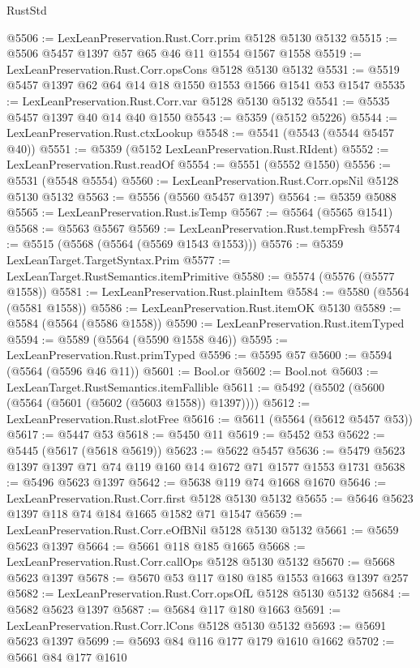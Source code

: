 \begin{lexlean}{RustStd}
\begin{coremodule}
{\begin{coremodule}
{{{{{{{{{{{{{{{{{{{{{{{{{{{{{{{{@5506 := LexLeanPreservation.Rust.Corr.prim @5128 @5130 @5132
@5515 := @5506 @5457 @1397 @57 @65 @46 @11 @1554 @1567 @1558
@5519 := LexLeanPreservation.Rust.Corr.opsCons @5128 @5130 @5132
@5531 := @5519 @5457 @1397 @62 @64 @14 @18 @1550 @1553 @1566 @1541 @53 @1547
@5535 := LexLeanPreservation.Rust.Corr.var @5128 @5130 @5132
@5541 := @5535 @5457 @1397 @40 @14 @40 @1550
@5543 := @5359 (@5152 @5226)
@5544 := LexLeanPreservation.Rust.ctxLookup
@5548 := @5541 (@5543 (@5544 @5457 @40))
@5551 := @5359 (@5152 LexLeanPreservation.Rust.RIdent)
@5552 := LexLeanPreservation.Rust.readOf
@5554 := @5551 (@5552 @1550)
@5556 := @5531 (@5548 @5554)
@5560 := LexLeanPreservation.Rust.Corr.opsNil @5128 @5130 @5132
@5563 := @5556 (@5560 @5457 @1397)
@5564 := @5359 @5088
@5565 := LexLeanPreservation.Rust.isTemp
@5567 := @5564 (@5565 @1541)
@5568 := @5563 @5567
@5569 := LexLeanPreservation.Rust.tempFresh
@5574 := @5515 (@5568 (@5564 (@5569 @1543 @1553)))
@5576 := @5359 LexLeanTarget.TargetSyntax.Prim
@5577 := LexLeanTarget.RustSemantics.itemPrimitive
@5580 := @5574 (@5576 (@5577 @1558))
@5581 := LexLeanPreservation.Rust.plainItem
@5584 := @5580 (@5564 (@5581 @1558))
@5586 := LexLeanPreservation.Rust.itemOK @5130
@5589 := @5584 (@5564 (@5586 @1558))
@5590 := LexLeanPreservation.Rust.itemTyped
@5594 := @5589 (@5564 (@5590 @1558 @46))
@5595 := LexLeanPreservation.Rust.primTyped
@5596 := @5595 @57
@5600 := @5594 (@5564 (@5596 @46 @11))
@5601 := Bool.or
@5602 := Bool.not
@5603 := LexLeanTarget.RustSemantics.itemFallible
@5611 := @5492 (@5502 (@5600 (@5564 (@5601 (@5602 (@5603 @1558)) @1397))))
@5612 := LexLeanPreservation.Rust.slotFree
@5616 := @5611 (@5564 (@5612 @5457 @53))
@5617 := @5447 @53
@5618 := @5450 @11
@5619 := @5452 @53
@5622 := @5445 (@5617 (@5618 @5619))
@5623 := @5622 @5457
@5636 := @5479 @5623 @1397 @1397 @71 @74 @119 @160 @14 @1672 @71 @1577 @1553 @1731
@5638 := @5496 @5623 @1397
@5642 := @5638 @119 @74 @1668 @1670
@5646 := LexLeanPreservation.Rust.Corr.first @5128 @5130 @5132
@5655 := @5646 @5623 @1397 @118 @74 @184 @1665 @1582 @71 @1547
@5659 := LexLeanPreservation.Rust.Corr.eOfBNil @5128 @5130 @5132
@5661 := @5659 @5623 @1397
@5664 := @5661 @118 @185 @1665
@5668 := LexLeanPreservation.Rust.Corr.callOps @5128 @5130 @5132
@5670 := @5668 @5623 @1397
@5678 := @5670 @53 @117 @180 @185 @1553 @1663 @1397 @257
@5682 := LexLeanPreservation.Rust.Corr.opsOfL @5128 @5130 @5132
@5684 := @5682 @5623 @1397
@5687 := @5684 @117 @180 @1663
@5691 := LexLeanPreservation.Rust.Corr.lCons @5128 @5130 @5132
@5693 := @5691 @5623 @1397
@5699 := @5693 @84 @116 @177 @179 @1610 @1662
@5702 := @5661 @84 @177 @1610
}}}}}}}}}}}}}}}}}}}}}}}}}}}}}}}}
\end{coremodule}}
\end{coremodule}
\end{lexlean}
